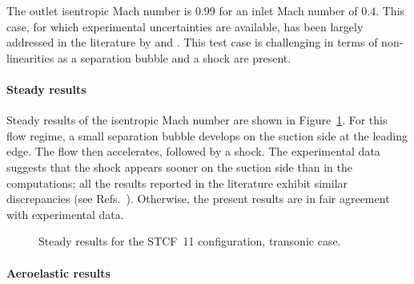 
The outlet isentropic Mach number is $0.99$ for an inlet Mach number of $0.4$. 
This case, for which experimental uncertainties are available, 
has been largely addressed in the literature by
\citet{Sbardella2001,Duta2002,Campobasso2003,Cinnella2004} and \citet{Huang2013a}. 
This test case is challenging in terms of non-linearities as a separation bubble and a shock are present.

\paragraph{Steady results}

Steady results of the isentropic Mach number are shown in
Figure~\ref{fig:stcf11_rans_transonic}.  For this flow regime,
a small separation
bubble develops on the suction side at the leading edge.  
The flow then accelerates, followed by a shock.  
The experimental data suggests that the shock appears
sooner on the suction side than in the computations; all the results 
reported in the literature exhibit similar discrepancies (see
Refs.~\cite{Fransson1999,Sbardella2001,Duta2002,Campobasso2003,Cinnella2004,Huang2013a}). 
Otherwise, the present results are in fair agreement with experimental data.
\begin{figure}[htp]
  \centering
  \caption{Steady results for the STCF~11 configuration, transonic case.}
  \label{fig:stcf11_rans_transonic}
\end{figure}

\paragraph{Aeroelastic results}

